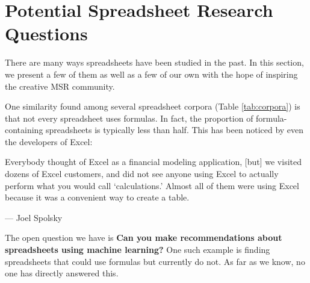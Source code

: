 \documentclass[conference]{IEEEtran}
\newcommand{\xlscount}{249,376}
\begin{document}
% 
% 


\section{Potential Spreadsheet Research Questions}
\label{how_to_use_fuse}
There are many ways spreadsheets have been studied in the past.  
In this section, we present a few of them as well as a few of our own with the hope of inspiring the creative MSR community.

One similarity found among several spreadsheet corpora (Table \ref{tab:corpora}) is that not every spreadsheet uses formulas.  
In fact, the proportion of formula-containing spreadsheets is typically less than half.
This has been noticed by even the developers of Excel:
\begin{displayquote}
Everybody thought of Excel as a financial modeling application, [but] we visited dozens of Excel customers, and did not see anyone using Excel to actually perform what you would call `calculations.' Almost all of them were using Excel because it was a convenient way to create a table.

 --- Joel Spolsky~\cite{JoelOnSoftware}
\end{displayquote}
The open question we have is \textbf{Can you make recommendations about spreadsheets using machine learning?} 
One such example is finding spreadsheets that could use formulas but currently do not.
As far as we know, no one has directly answered this.
\end{document}
